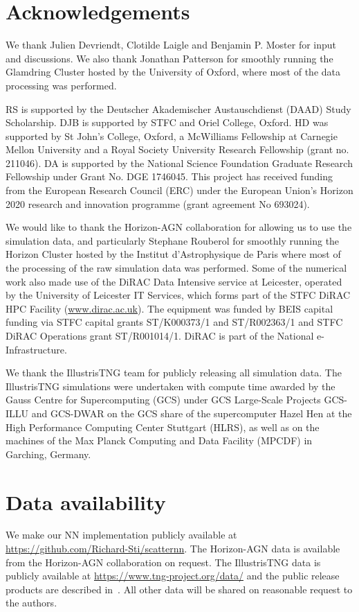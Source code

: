 \documentclass[useAMS,usenatbib]{mnras}
\begin{document}
\section*{Acknowledgements}

We thank Julien Devriendt, Clotilde Laigle and Benjamin P. Moster for input and discussions. We also thank Jonathan Patterson for smoothly running the Glamdring Cluster hosted by the University of Oxford, where most of the data processing was performed.

RS is supported by the Deutscher Akademischer Austauschdienst (DAAD) Study Scholarship. DJB is supported by STFC and Oriel College, Oxford. HD was supported by St John's College, Oxford, a McWilliams Fellowship at Carnegie Mellon University and a Royal Society University Research Fellowship (grant no. 211046). DA is supported by the National Science Foundation Graduate Research Fellowship under Grant No. DGE 1746045. This project has received funding from the European Research Council (ERC) under the European Union’s Horizon 2020 research and innovation programme (grant agreement No 693024).

We would like to thank the Horizon-AGN collaboration for allowing us to use the simulation data, and particularly Stephane Rouberol for smoothly running the Horizon Cluster hosted by the Institut d'Astrophysique de Paris where most of the processing of the raw simulation data was performed. Some of the numerical work also made use of the DiRAC Data Intensive service at Leicester, operated by the University of Leicester IT Services, which forms part of the STFC DiRAC HPC Facility (\url{www.dirac.ac.uk}). The equipment was funded by BEIS capital funding via STFC capital grants ST/K000373/1 and ST/R002363/1 and STFC DiRAC Operations grant ST/R001014/1. DiRAC is part of the National e-Infrastructure.

We thank the IllustrisTNG team for publicly releasing all simulation data. The IllustrisTNG simulations were undertaken with compute time awarded by the Gauss Centre for Supercomputing (GCS) under GCS Large-Scale Projects GCS-ILLU and GCS-DWAR on the GCS share of the supercomputer Hazel Hen at the High Performance Computing Center Stuttgart (HLRS), as well as on the machines of the Max Planck Computing and Data Facility (MPCDF) in Garching, Germany.

\section*{Data availability}
We make our \ac{NN} implementation publicly available at \url{https://github.com/Richard-Sti/scatternn}. The Horizon-AGN data is available from the Horizon-AGN collaboration on request. The IllustrisTNG data is publicly available at \url{https://www.tng-project.org/data/} and the public release products are described in~\citet{Nelson_2019}. All other data will be shared on reasonable request to the authors.


\appendix




\label{lastpage}
\end{document}
